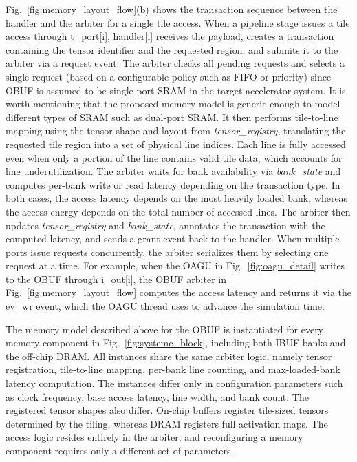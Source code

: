 \documentclass[lettersize,journal]{IEEEtran}
\begin{document}
Fig.~\ref{fig:memory_layout_flow}(b) shows the transaction sequence between the handler and the arbiter for a single tile access.
When a pipeline stage issues a tile access through t\_port[i], handler[i] receives the payload, creates a transaction containing the tensor identifier and the requested region, and submits it to the arbiter via a request event.
The arbiter checks all pending requests and selects a single request (based on a configurable policy such as FIFO or priority) since OBUF is assumed to be single-port SRAM in the target accelerator system. It is worth mentioning that the proposed memory model is generic enough to model different types of SRAM such as dual-port SRAM.
It then performs tile-to-line mapping using the tensor shape and layout from \textit{tensor\_registry}, translating the requested tile region into a set of physical line indices.
Each line is fully accessed even when only a portion of the line contains valid tile data, which accounts for line underutilization.
The arbiter waits for bank availability via \textit{bank\_state} and computes per-bank write or read latency depending on the transaction type.
In both cases, the access latency depends on the most heavily loaded bank, whereas the access energy depends on the total number of accessed lines.
The arbiter then updates \textit{tensor\_registry} and \textit{bank\_state}, annotates the transaction with the computed latency, and sends a grant event back to the handler.
When multiple ports issue requests concurrently, the arbiter serializes them by selecting one request at a time.
For example, when the OAGU in Fig.~\ref{fig:oagu_detail} writes to the OBUF through i\_out[i], the OBUF arbiter in Fig.~\ref{fig:memory_layout_flow} computes the access latency and returns it via the ev\_wr event, which the OAGU thread uses to advance the simulation time.

The memory model described above for the OBUF is instantiated for every memory component in Fig.~\ref{fig:systemc_block}, including both IBUF banks and the off-chip DRAM.
All instances share the same arbiter logic, namely tensor registration, tile-to-line mapping, per-bank line counting, and max-loaded-bank latency computation.
The instances differ only in configuration parameters such as clock frequency, base access latency, line width, and bank count.
The registered tensor shapes also differ. On-chip buffers register tile-sized tensors determined by the tiling, whereas DRAM registers full activation maps.
The access logic resides entirely in the arbiter, and reconfiguring a memory component requires only a different set of parameters.
\end{document}
